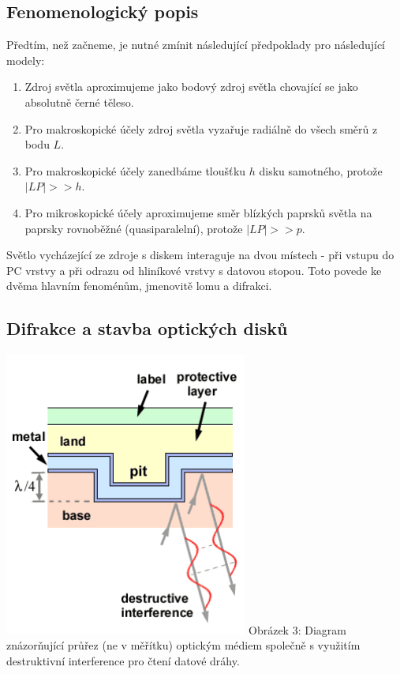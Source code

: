 \documentclass[titlepage]{article}
\begin{document}
\subsection{Fenomenologický popis}
Předtím, než začneme, je nutné zmínit následující předpoklady pro následující modely:
\begin{enumerate}
    \item {} \label{approx:1} Zdroj světla aproximujeme jako bodový zdroj světla chovající se jako absolutně černé těleso.
    \item {} \label{approx:2} Pro makroskopické účely zdroj světla vyzařuje radiálně do všech směrů z bodu $L$.
    \item {} \label{approx:3} Pro makroskopické účely zanedbáme tloušťku $h$ disku samotného, protože $|LP| >> h$.
    \item {} \label{approx:4} Pro mikroskopické účely aproximujeme směr blízkých paprsků světla na paprsky rovnoběžné (quasiparalelní), protože $|LP| >> p$.
\end{enumerate}

\pagebreak

Světlo vycházející ze zdroje s diskem interaguje na dvou místech - při vstupu do PC vrstvy a při odrazu od hliníkové vrstvy s datovou stopou. Toto povede ke dvěma hlavním fenoménům, jmenovitě lomu a difrakci.

\subsection{Difrakce a stavba optických disků}
\begin{center}
     \label{image:3}
    \includegraphics[width=8cm]{construction1.png}
    \linebreak
    Obrázek 3: Diagram znázorňující průřez (ne v měřítku) optickým médiem společně s využitím destruktivní interference pro čtení datové dráhy.  \cite{img3}
\end{center}
\end{document}
